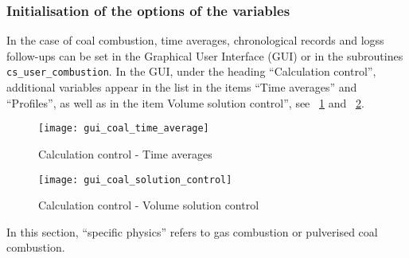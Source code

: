 {{{%
\subsubsection{Initialisation of the options of the variables}
In the case of coal combustion, time averages, chronological records and logss follow-ups can be set in the Graphical User Interface (GUI) or in the subroutines \texttt{cs\_user\_combustion}. In the GUI, under the heading ``Calculation control'', additional variables appear in the list in the items ``Time averages'' and ``Profiles'', as well as in the item Volume solution control'', see \figurename~\ref{fig:t_average-coal} and \figurename~\ref{fig:V_control-coal}.

\begin{figure}[!ht]
\begin{center}
\texttt{[image: gui\_coal\_time\_average]}
\caption{Calculation control - Time averages}
\label{fig:t_average-coal}
\end{center}
\end{figure}

\begin{figure}[!ht]
\begin{center}
\texttt{[image: gui\_coal\_solution\_control]}
\caption{Calculation control - Volume solution control}
\label{fig:V_control-coal}
\end{center}
\end{figure}

In this section, ``specific physics'' refers to gas combustion or
pulverised coal combustion.

}}}
